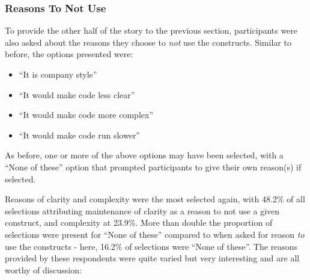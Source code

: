 \documentclass{article}
\begin{document}
        \subsubsection{Reasons To Not Use}
            To provide the other half of the story to the previous section, participants were also asked about the reasons they choose to \emph{not} use the constructs. Similar to before, the options presented were:
            \begin{itemize}
                \item ``It is company style''
                \item ``It would make code less clear''
                \item ``It would make code more complex''
                \item ``It would make code run slower''
            \end{itemize}
            As before, one or more of the above options may have been selected, with a ``None of these'' option that prompted participants to give their own reason(s) if selected.
            \newline

            Reasons of clarity and complexity were the most selected again, with 48.2\% of all selections attributing maintenance of clarity as a reason to not use a given construct, and complexity at 23.9\%. More than double the proportion of selections were present for ``None of these'' compared to when asked for reason \emph{to} use the constructs - here, 16.2\% of selections were ``None of these''. The reasons provided by these respondents were quite varied but very interesting and are all worthy of discussion:
\end{document}
